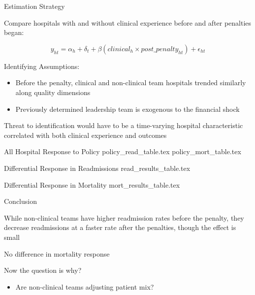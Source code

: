 \documentclass[notes,11pt, aspectratio=169]{beamer}
\newenvironment{wideitemize}{\itemize\addtolength{\itemsep}{10pt}}{\enditemize}
\begin{document}
\begin{frame}{Estimation Strategy}

    Compare hospitals with and without clinical experience before and after penalties began:

    \vspace{3mm}
    
    \begin{equation*}
    y_{ht} = \alpha_{h} + \delta_t + \beta (clinical_h \times post\_penalty_{ht}) + \epsilon_{ht}
    \end{equation*}

    \vspace{10mm}\pause

    Identifying Assumptions:
    \begin{itemize}
        \item Before the penalty, clinical and non-clinical team hospitals trended similarly along quality dimensions
        \item Previously determined leadership team is exogenous to the financial shock
    \end{itemize}

    \vspace{5mm}

    Threat to identification would have to be a time-varying hospital characteristic correlated with both clinical experience and outcomes
\end{frame}

\begin{frame}{All Hospital Response to Policy}\footnotesize
    {policy_read_table.tex}
    {policy_mort_table.tex}
\end{frame}


\begin{frame}{Differential Response in Readmissions}
   \small {read_results_table.tex}
\end{frame}

\begin{frame}{Differential Response in Mortality}
    \small {mort_results_table.tex}
\end{frame}

\begin{frame}{Conclusion}
\begin{wideitemize}
    \item While non-clinical teams have higher readmission rates before the penalty, they decrease readmissions at a faster rate after the penalties, though the effect is small
    \item No difference in mortality response
\end{wideitemize}

\vspace{10mm}

Now the question is why? 
\begin{itemize}
    \item Are non-clinical teams adjusting patient mix? 
\end{itemize}
\end{frame}
\end{document}
